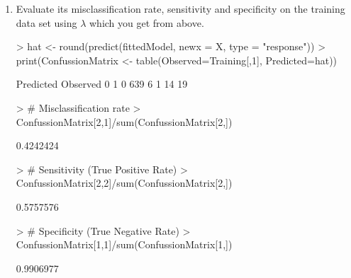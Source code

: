 \documentclass[12pt,a4paper]{paper}
\begin{document}
\begin{enumerate}
\begin{enumerate}
\begin{enumerate}
\begin{Schunk}
\end{Schunk}
\item Evaluate its misclassification rate, sensitivity and specificity on the training data
set using $\lambda$ which you get from above.
\begin{Schunk}
\begin{Sinput}
> hat <- round(predict(fittedModel, newx = X, type = "response"))
> print(ConfussionMatrix <- table(Observed=Training[,1], Predicted=hat))
\end{Sinput}
\begin{Soutput}
        Predicted
Observed   0   1
       0 639   6
       1  14  19
\end{Soutput}
\begin{Sinput}
> # Misclassification rate
> ConfussionMatrix[2,1]/sum(ConfussionMatrix[2,])
\end{Sinput}
\begin{Soutput}
[1] 0.4242424
\end{Soutput}
\begin{Sinput}
> # Sensitivity (True Positive Rate)
> ConfussionMatrix[2,2]/sum(ConfussionMatrix[2,])
\end{Sinput}
\begin{Soutput}
[1] 0.5757576
\end{Soutput}
\begin{Sinput}
> # Specificity (True Negative Rate)
> ConfussionMatrix[1,1]/sum(ConfussionMatrix[1,])
\end{Sinput}
\begin{Soutput}
[1] 0.9906977
\end{Soutput}
\end{Schunk}
\end{enumerate}
\end{enumerate}
\end{enumerate}
\end{document}
